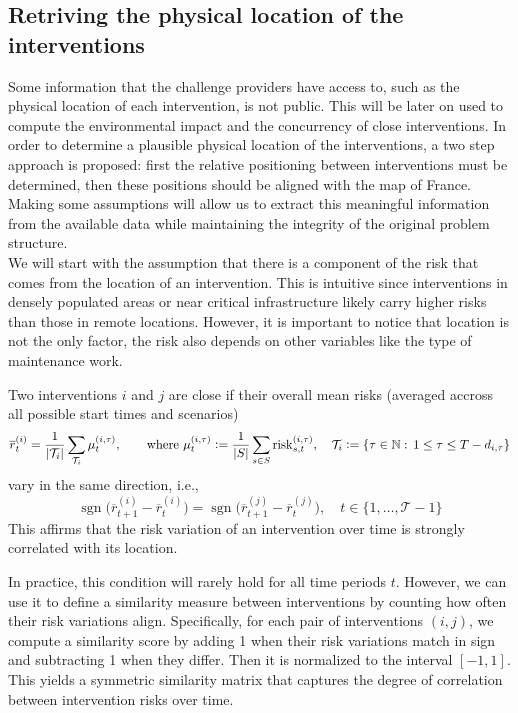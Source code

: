 \subsection{Retriving the physical location of the interventions}
\label{sec:dist_mat}
Some information that the challenge providers have access to, such as the physical location of each intervention, is not public. This will be later on used to compute the environmental impact and the concurrency of close interventions. In order to determine a plausible physical location of the interventions, a two step approach is proposed: first the relative positioning between interventions must be determined, then these positions should be aligned with the map of France. Making some assumptions will allow us to extract this meaningful information from the available data while maintaining the integrity of the original problem structure.\\

We will start with the assumption that there is a component of the risk that comes from the location of an intervention. This is intuitive since interventions in densely populated areas or near critical infrastructure likely carry higher risks than those in remote locations. However, it is important to notice that location is not the only factor, the risk also depends on other variables like the type of maintenance work. \\ 

\begin{assumption}
  Two interventions \(i\) and \(j\) are close if their overall mean risks (averaged accross all possible start times and scenarios)
  \[
  \overline{r}_t^{(i)} = \frac{1}{\left|\mathcal{T}_i\right|}\sum_{\mathcal{T}_i}\mu_t^{(i,\tau)}, 
  \qquad \text{where }\mu_t^{(i,\tau)} \mathrel{\mathop:}= \frac{1}{|S|}\sum_{s\in S} \mathrm{risk}_{s,t}^{(i,\tau)}, \quad
  \mathcal{T}_i\mathrel{\mathop:}= \{\tau\in \mathbb{N}:\,1\leq \tau \leq T-d_{i,\tau}\}
  \]
  vary in the same direction, i.e.,
  \[
  \operatorname{sgn}\Big(\overline{r}_{t+1}^{(i)}-\overline{r}_t^{(i)}\Big)=\operatorname{sgn}\Big(\overline{r}_{t+1}^{(j)}-\overline{r}_t^{(j)}\Big),\quad t\in\{1,\dots , \mathcal{T}-1\}
  \]
  This affirms that the risk variation of an intervention over time is strongly correlated with its location.
\end{assumption}


In practice, this condition will rarely hold for all time periods $t$. However, we can use it to define a similarity measure between interventions by counting how often their risk variations align. Specifically, for each pair of interventions $(i,j)$, we compute a similarity score by adding 1 when their risk variations match in sign and subtracting 1 when they differ. Then it is normalized to the interval $[-1,1]$. This yields a symmetric similarity matrix that captures the degree of correlation between intervention risks over time.

